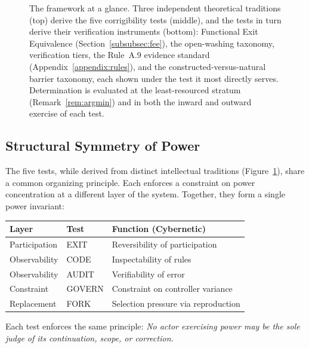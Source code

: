 \documentclass{article}
\begin{document}
\begin{figure}[H]
\caption{The framework at a glance. Three independent theoretical traditions (top) derive the five corrigibility tests (middle), and the tests in turn derive their verification instruments (bottom): Functional Exit Equivalence (Section~\ref{subsubsec:fee}), the open-washing taxonomy, verification tiers, the Rule~A.9 evidence standard (Appendix~\ref{appendix:rules}), and the constructed-versus-natural barrier taxonomy, each shown under the test it most directly serves. Determination is evaluated at the least-resourced stratum (Remark~\ref{rem:argmin}) and in both the inward and outward exercise of each test.}
\label{fig:framework}
\end{figure}

\subsection{Structural Symmetry of Power}

The five tests, while derived from distinct intellectual traditions (Figure~\ref{fig:framework}), share a common organizing principle. Each enforces a constraint on power concentration at a different layer of the system. Together, they form a single power invariant:

\begin{center}
\begin{tabular}{@{}lll@{}}
\toprule
\textbf{Layer} & \textbf{Test} & \textbf{Function (Cybernetic)} \\
\midrule
Participation & EXIT & Reversibility of participation \\
Observability & CODE & Inspectability of rules \\
Observability & AUDIT & Verifiability of error \\
Constraint & GOVERN & Constraint on controller variance \\
Replacement & FORK & Selection pressure via reproduction \\
\bottomrule
\end{tabular}
\end{center}

Each test enforces the same principle: \textit{No actor exercising power may be the sole judge of its continuation, scope, or correction.}
\end{document}
